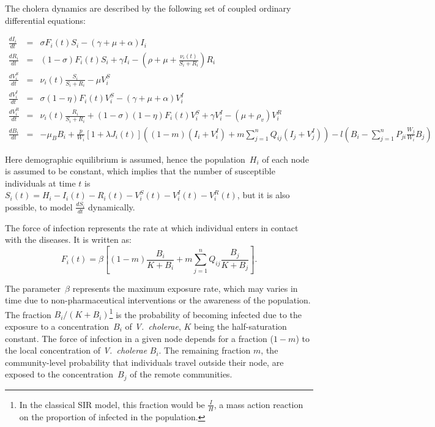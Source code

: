 The cholera dynamics are described by the following set of coupled ordinary differential equations:
\begin{fullwidth}

\begingroup
\allowdisplaybreaks
\begin{eqnarray}
\frac{dI_i}{dt} &=& \sigma F_i(t) S_i - (\gamma + \mu + \alpha) I_i \label{eq:I2}\\
\frac{dR_i}{dt} &=& (1-\sigma) F_i(t) S_i + \gamma I_i - (\rho + \mu+\frac{\nu_i(t)}{S_i+R_i}) R_i \label{eq:R2}\\
\frac{dV^S_i}{dt} &=& \nu_i(t) \frac{S_i}{S_i+R_i}-\mu V^S_i \label{eq:VS2}\\
\frac{dV^I_i}{dt} &=& \sigma (1-\eta) F_i(t) V^S_i - (\gamma + \mu + \alpha) V^I_i \label{eq:VI2}\\
\frac{dV^R_i}{dt} &=& \nu_i(t) \frac{R_i}{S_i+R_i} + (1-\sigma) (1-\eta) F_i(t) V^S_i + \gamma V^I_i - (\mu+\rho_v) V^R_i \label{eq:VR2}\\
\frac{dB_i}{dt} &=& - \mu_B B_i +\frac{p}{W_i}\left[1 + \lambda J_i(t) \right] \left((1-m)(I_i +V_i^I)+m \sum_{j=1}^n Q_{ij} (I_j +V_j^I)\right)-  l \left( B_i - \sum_{j=1}^n P_{ji} \frac{W_j}{W_i} B_j \right)
\end{eqnarray}
\endgroup
\end{fullwidth}
Here demographic equilibrium is assumed, hence the population~$H_i$ of each node is assumed to be constant, which implies that the number of susceptible individuals at time $t$ is $S_i(t) = H_i - I_i(t) - R_i(t) - V_i^S(t) - V^I_i(t) - V_i^R(t)$, but it is also possible, to model $\frac{dS_i}{dt}$ dynamically.   

The force of infection represents the rate at which individual enters in contact with the diseases. It is written as:
\begin{equation}
F_i(t) = \beta \left[ (1 - m) \frac{B_i}{K + B_i} + m \sum_{j=1}^n Q_{ij} \frac{B_j}{K + B_j} \right].
\label{force}
\end{equation}

The parameter~$\beta$ represents the maximum exposure rate, which may varies in time due to non-pharmaceutical interventions or the awareness of the population\cite{Bertuzzo:ProbabilityExtinctionHaiti:2016}. The fraction $B_{i}/(K+B_{i})$\footnote{In the classical SIR model, this fraction would be $\frac{I}{H}$, a mass action reaction on the proportion of infected in the population.} is the probability of becoming infected due to the exposure to a concentration~$B_i$ of \textit{V.~cholerae}, $K$ being the half-saturation constant\cite{Codeco:EndemicEpidemicDynamics:2001}. The force of infection in a given node depends for a fraction ($1-m$) to the local concentration of \textit{V.~cholerae} $B_i$. The remaining fraction $m$, the community-level probability that individuals travel outside their node, are exposed to the concentration~$B_j$ of the remote communities. 

